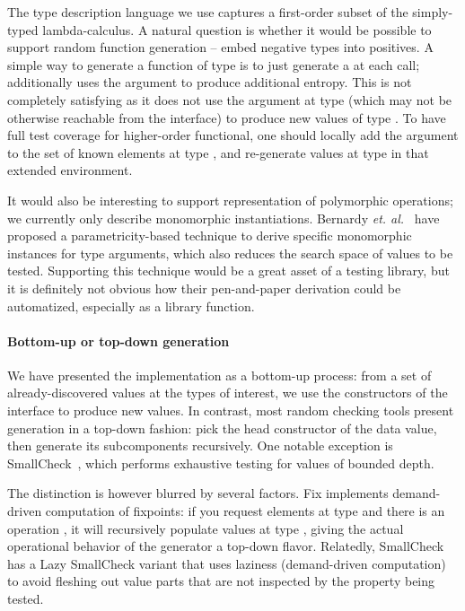 The type description language we use captures a first-order subset of
the simply-typed lambda-calculus. A natural question is whether it
would be possible to support random function generation -- embed
negative types into positives. A simple way to generate a function of
type  is to just generate a  at each call;
\qcheck additionally uses the  argument to produce additional
entropy. This is not completely satisfying as it does not use the
argument at type  (which may not be otherwise reachable from
the interface) to produce new values of type . To have full
test coverage for higher-order functional, one should locally add the
argument to the set of known elements at type , and
re-generate values at type  in that extended environment.

It would also be interesting to support representation of polymorphic
operations; we currently only describe monomorphic
instantiations. Bernardy \emph{et. al.}~\cite{DBLP:conf/esop/BernardyJC10} have proposed
a parametricity-based technique to derive specific monomorphic
instances for type arguments, which also reduces the search space of
values to be tested. Supporting this technique would be a great asset
of a testing library, but it is definitely not obvious how their
pen-and-paper derivation could be automatized, especially as a library
function.

\paragraph{Bottom-up or top-down generation}

We have presented the  implementation as a bottom-up
process: from a set of already-discovered values at the types of
interest, we use the constructors of the interface to produce new
values. In contrast, most random checking tools present generation in
a top-down fashion: pick the head constructor of the data value, then
generate its subcomponents recursively. One notable exception is
SmallCheck~\cite{DBLP:conf/haskell/RuncimanNL08}, which performs
exhaustive testing for values of bounded depth.

The distinction is however blurred by several factors. Fix implements
demand-driven computation of fixpoints: if you request elements at
type  and there is an operation , it will
recursively populate values at type , giving the actual
operational behavior of the generator a top-down flavor. Relatedly,
SmallCheck has a Lazy SmallCheck variant that uses laziness
(demand-driven computation) to avoid fleshing out value parts that are
not inspected by the property being tested.

